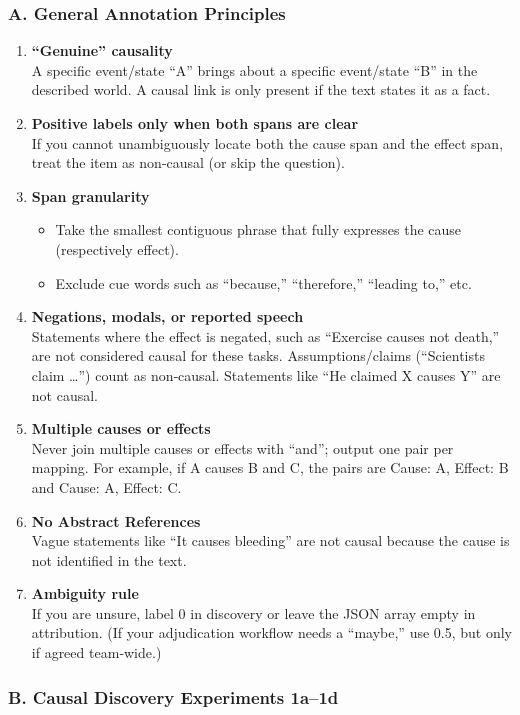 \documentclass[conference]{IEEEtran}
\begin{document}
\subsubsection*{A. General Annotation Principles}
\begin{enumerate}
  \item \textbf{“Genuine” causality}\\
  A specific event/state “A” brings about a specific event/state “B” in the described world. A causal link is only present if the text states it as a fact.
  \item \textbf{Positive labels only when both spans are clear}\\
  If you cannot unambiguously locate both the cause span and the effect span, treat the item as non‑causal (or skip the question).
  \item \textbf{Span granularity}
  \begin{itemize}
    \item Take the smallest contiguous phrase that fully expresses the cause (respectively effect).
    \item Exclude cue words such as “because,” “therefore,” “leading to,” etc.
  \end{itemize}
  \item \textbf{Negations, modals, or reported speech}\\
  Statements where the effect is negated, such as “Exercise causes not death,” are not considered causal for these tasks. Assumptions/claims (“Scientists claim …”) count as non‑causal. Statements like “He claimed X causes Y” are not causal.
  \item \textbf{Multiple causes or effects}\\
  Never join multiple causes or effects with “and”; output one pair per mapping. For example, if A causes B and C, the pairs are Cause: A, Effect: B and Cause: A, Effect: C.
  \item \textbf{No Abstract References}\\
  Vague statements like “It causes bleeding” are not causal because the cause is not identified in the text.
  \item \textbf{Ambiguity rule}\\
  If you are unsure, label 0 in discovery or leave the JSON array empty in attribution. (If your adjudication workflow needs a “maybe,” use 0.5, but only if agreed team‑wide.)
\end{enumerate}

\subsubsection*{B. Causal Discovery Experiments 1a--1d}
\end{document}

